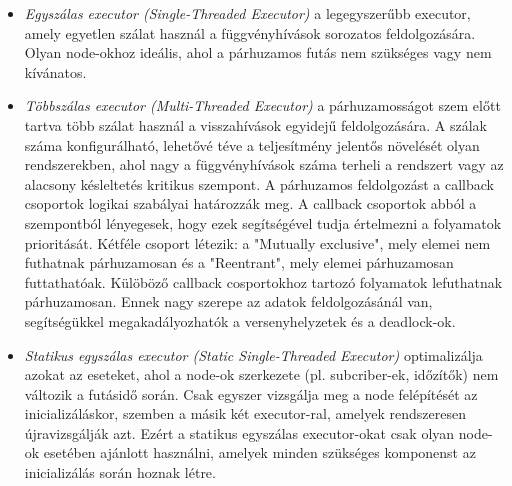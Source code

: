 \begin{itemize}
    \item \emph{Egyszálas executor (Single-Threaded Executor)} a legegyszerűbb executor, amely egyetlen szálat használ a függvényhívások sorozatos feldolgozására. Olyan node-okhoz ideális, ahol a párhuzamos futás nem szükséges vagy nem kívánatos. \cite{ros2}

    \item \emph{Többszálas executor (Multi-Threaded Executor)} a párhuzamosságot szem előtt tartva több szálat használ a visszahívások egyidejű feldolgozására. A szálak száma konfigurálható, lehetővé téve a teljesítmény jelentős növelését olyan rendszerekben, ahol nagy a függvényhívások száma terheli a rendszert vagy az alacsony késleltetés kritikus szempont. A párhuzamos feldolgozást a callback csoportok logikai szabályai határozzák meg. A callback csoportok abból a szempontból lényegesek, hogy ezek segítségével tudja értelmezni a folyamatok prioritását. Kétféle csoport létezik: a "Mutually exclusive", mely elemei nem futhatnak párhuzamosan és a "Reentrant", mely elemei párhuzamosan futtathatóak. Külöböző callback cosportokhoz tartozó folyamatok lefuthatnak párhuzamosan. Ennek nagy szerepe az adatok feldolgozásánál van, segítségükkel megakadályozhatók a versenyhelyzetek és a deadlock-ok. \cite{ros2}

    \item \emph{Statikus egyszálas executor (Static Single-Threaded Executor)} optimalizálja azokat az eseteket, ahol a node-ok szerkezete (pl. subcriber-ek, időzítők) nem változik a futásidő során. Csak egyszer vizsgálja meg a node felépítését az inicializáláskor, szemben a másik két executor-ral, amelyek rendszeresen újravizsgálják azt. Ezért a statikus egyszálas executor-okat csak olyan node-ok esetében ajánlott használni, amelyek minden szükséges komponenst az inicializálás során hoznak létre. \cite{ros2}
\end{itemize}

